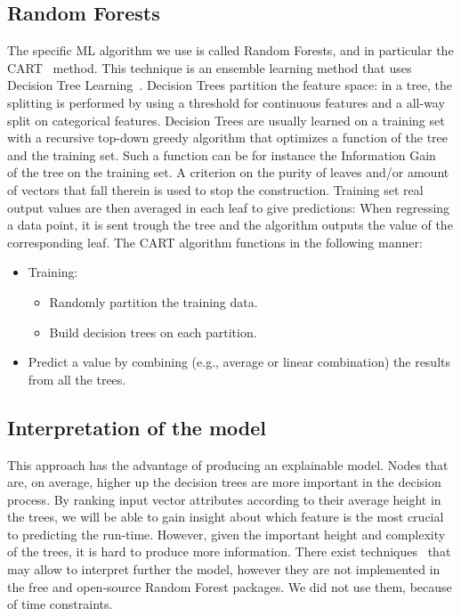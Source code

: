 \documentclass{article}
\begin{document}
  \subsection{Random Forests}
  \label{sub:random_forests}
  The specific ML algorithm we use is called Random Forests, and in particular the CART~\cite{randomforest} method.
  This technique is an ensemble learning method that uses Decision Tree Learning~\cite{decisiontrees}.
  Decision Trees partition the feature space: in a tree, the splitting is performed by using a threshold for continuous features and a all-way split on categorical features.
  Decision Trees are usually learned on a training set with a recursive top-down greedy algorithm that optimizes a function of the tree and the training set.
  Such a function can be for instance the Information Gain~\cite{kullback} of the tree on the training set. A criterion on the purity of leaves and/or amount of vectors that fall therein is used to stop the construction. Training set real output values are then averaged in each leaf to give predictions: When regressing a data point, it is sent trough the tree and the algorithm outputs the value of the corresponding leaf.
  The CART algorithm functions in the following manner:
  \begin{itemize}
    \item Training: \begin{itemize}
        \item Randomly partition the training data.
        \item Build decision trees on each partition.
      \end{itemize}
    \item Predict a value by combining (e.g., average or linear combination) the results from all the trees.
  \end{itemize}

  \subsection{Interpretation of the model}
  \label{sub:explainability}
  This approach has the advantage of producing an explainable model.
  Nodes that are, on average, higher up the decision trees are more important in the decision process.
  By ranking input vector attributes according to their average height in the trees, we will be able to gain insight about which feature is the most crucial to predicting the run-time.
  However, given the important height and complexity of the trees, it is hard to produce more information.
  There exist techniques~\cite{interpret} that may allow to interpret further the model, however they are not implemented in the free and open-source Random Forest packages. We did not use them, because of time constraints.
\end{document}
